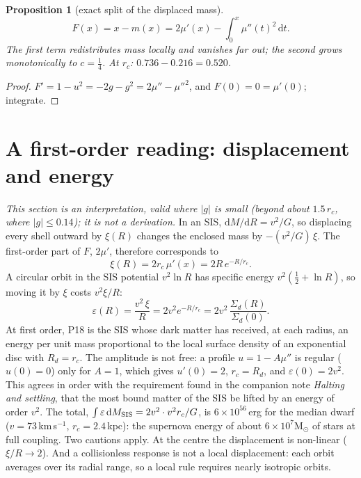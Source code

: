 \documentclass[11pt,a4paper]{article}
\newtheorem{proposition}{Proposition}
\theoremstyle{definition}
\theoremstyle{remark}
\newcommand{\rc}{r_c}
\newcommand{\Rd}{R_d}
\newcommand{\dd}{\mathrm{d}}
\newcommand{\Msun}{\mathrm{M}_\odot}
\begin{document}
\begin{proposition}[exact split of the displaced mass]\label{prop:split}
\begin{equation}
  F(x)=x-m(x)=2\mu'(x)-\int_0^x\mu''(t)^2\,\dd t .
\end{equation}
The first term redistributes mass locally and vanishes far out; the second grows
monotonically to $c=\tfrac14$. At $\rc$: $0.736-0.216=0.520$.
\end{proposition}
\begin{proof}
$F'=1-u^2=-2g-g^2=2\mu''-\mu''^2$, and $F(0)=0=\mu'(0)$; integrate.
\end{proof}

\section{A first-order reading: displacement and energy}\label{sec:reading}

\emph{This section is an interpretation, valid where $|g|$ is small (beyond about
$1.5\,\rc$, where $|g|\le0.14$); it is not a derivation.} In an SIS,
$\dd M/\dd R=v^2/G$, so displacing every shell outward by $\xi(R)$ changes the enclosed mass by
$-(v^2/G)\,\xi$. The first-order part of $F$, $2\mu'$, therefore corresponds to
\begin{equation}
  \xi(R)=2\rc\,\mu'(x)=2R\,e^{-R/\rc}.
\end{equation}
A circular orbit in the SIS potential $v^2\ln R$ has specific energy $v^2(\tfrac12+\ln R)$, so
moving it by $\xi$ costs $v^2\xi/R$:
\begin{equation}
  \varepsilon(R)=\frac{v^2\,\xi}{R}=2v^2e^{-R/\rc}=2v^2\,\frac{\Sigma_d(R)}{\Sigma_d(0)} .
  \label{eq:eps}
\end{equation}
At first order, P18 is the SIS whose dark matter has received, at each radius, an energy per
unit mass proportional to the local surface density of an exponential disc with $\Rd=\rc$.
The amplitude is not free: a profile $u=1-A\mu''$ is regular ($u(0)=0$) only for $A=1$, which
gives $u'(0)=2$, $\rc=\Rd$, and $\varepsilon(0)=2v^2$. This agrees in order with the
requirement found in the companion note \emph{Halting and settling}, that the most bound
matter of the SIS be lifted by an energy of order $v^2$. The total,
$\int\varepsilon\,\dd M_{\rm SIS}=2v^2\cdot v^2\rc/G$, is $6\times10^{56}$\,erg for the median
dwarf ($v=73\,$km\,s$^{-1}$, $\rc=2.4$\,kpc): the supernova energy of about
$6\times10^7\Msun$ of stars at full coupling. Two cautions apply. At the centre the
displacement is non-linear ($\xi/R\to2$). And a collisionless response is not a local
displacement: each orbit averages over its radial range, so a local rule requires nearly
isotropic orbits.
\end{document}

